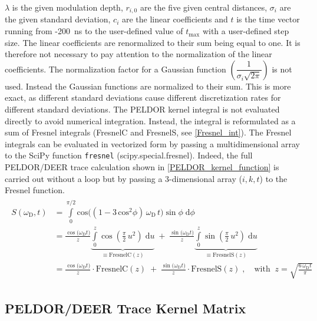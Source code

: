 \documentclass[pdftex,bezier,german,a4,twoside, headexclude,12pt,nochapterprefix, titlepage]{extarticle}
\begin{document}
$\lambda$ is the given modulation depth, $r_{i,0}$ are the five given central distances, $\sigma_i$ are the given standard deviation, $c_i$ are the linear coefficients and $t$ is the time vector running from -200~ns to the user-defined value of $t_{\mathrm{max}}$ with a user-defined step size. The linear coefficients are renormalized to their sum being equal to one. It is therefore not necessary to pay attention to the normalization of the linear coefficients.
The normalization factor for a Gaussian function $\left(\dfrac{1}{\sigma_i \sqrt{2\pi}}\right)$ is not used. Instead the Gaussian functions are normalized to their sum. This is more exact, as different standard deviations cause different discretization rates for different standard deviations. The PELDOR kernel integral is not evaluated directly to avoid numerical integration. Instead, the integral is reformulated as a sum of Fresnel integrals (FresnelC and FresnelS, see \autoref{Fresnel_int}). The Fresnel integrals can be evaluated in vectorized form by passing a multidimensional array to the SciPy function
\texttt{fresnel} (scipy.special.fresnel). Indeed, the full PELDOR/DEER trace calculation shown in \autoref{PELDOR_kernel_function} is carried out without a loop but by passing a 3-dimensional array ($i,k,t$) to the Fresnel function.
%
\begin{eqnarray}
\begin{split}
S(\omega_{\text{D}},t) & = \int\limits_{0}^{\pi/2}\mathrm{cos}\Big((1-3\,\mathrm{cos}^2\phi)\,\omega_{\text{D}}\,t\Big)\sin \phi\; \text{d}\phi \\ 
   & = 
   \frac{\cos{\big(\omega_{\text{D}}t \big)}}{z} 
   \underbrace{\int\limits_{0}^{z} \cos{\left( \frac{\pi}{2}\,u^{2} \right)} 
   \;\text{d}u}_{\equiv \text{FresnelC}(z)} \; + \; 
   \frac{\sin{\big(\omega_{\text{D}} t \big)}}{z}
   \underbrace{\int\limits_{0}^{z} 
   \sin{\left( \frac{\pi}{2}\,u^{2} \right)}\;\text{d}u}_{\equiv \text{FresnelS}(z)}      
\label{eqFresnel08} \\[2mm]
   & =  \frac{\cos{\big(\omega_{\text{D}}t \big)}}{z} \cdot \text{FresnelC}(z) \; + \;
   \frac{\sin{\big(\omega_{\text{D}} t\big)}}{z} \cdot \text{FresnelS}(z)\; ,
   \quad\text{with}\;\; z = \sqrt{\frac{6\,\omega_{\text{D}} t }{\pi}}
\label{eqFresnel09}  
\end{split}
\label{Fresnel_int}
\end{eqnarray}


\vspace*{1em}

\subsection{PELDOR/DEER Trace Kernel Matrix}
\end{document}
